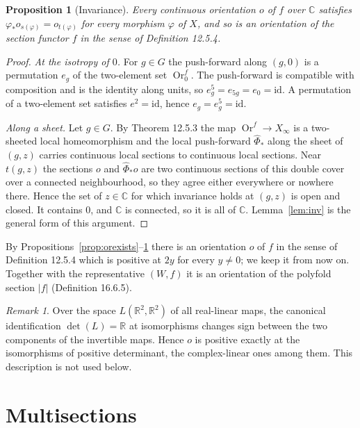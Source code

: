 \documentclass[11pt,a4paper]{article}
\theoremstyle{plain}
\newtheorem{proposition}[theorem]{Proposition}
\theoremstyle{definition}
\theoremstyle{remark}
\newtheorem{remark}[theorem]{Remark}
\newcommand{\C}{\mathbb{C}}
\newcommand{\R}{\mathbb{R}}
\newcommand{\abs}[1]{\lvert #1\rvert}
\newcommand{\Or}{\operatorname{Or}}
\newcommand{\id}{\mathrm{id}}
\begin{document}
\begin{proposition}[Invariance]\label{prop:orinvariant}
Every continuous orientation $o$ of $f$ over $\C$ satisfies $\varphi_*o_{s(\varphi)}=o_{t(\varphi)}$ for
every morphism $\varphi$ of $X$, and so is an orientation of the section functor $f$ in the sense of
Definition 12.5.4.
\end{proposition}

\begin{proof}
\emph{At the isotropy of $0$.} For $g\in G$ the push-forward along $(g,0)$ is a permutation $e_g$ of the
two-element set $\Or^f_0$. The push-forward is compatible with composition and is the identity along
units, so $e_g^5=e_{5g}=e_0=\id$. A permutation of a two-element set satisfies $e^2=\id$, hence
$e_g=e_g^5=\id$.

\emph{Along a sheet.} Let $g\in G$. By Theorem 12.5.3 the map $\Or^f\to X_\infty$ is a two-sheeted local
homeomorphism and the local push-forward $\hat\Phi_*$ along the sheet of $(g,z)$ carries continuous
local sections to continuous local sections. Near $t(g,z)$ the sections $o$ and $\hat\Phi_*o$ are two
continuous sections of this double cover over a connected neighbourhood, so they agree either everywhere
or nowhere there. Hence the set of $z\in\C$ for which invariance holds at $(g,z)$ is open and closed. It
contains $0$, and $\C$ is connected, so it is all of $\C$. Lemma~\ref{lem:inv} is the general form of
this argument.
\end{proof}

By Propositions~\ref{prop:orexists}--\ref{prop:orinvariant} there is an orientation $o$ of $f$ in the
sense of Definition 12.5.4 which is positive at $2y$ for every $y\neq0$; we keep it from now on.
Together with the representative $(W,f)$ it is an orientation of the polyfold section $\abs f$
(Definition 16.6.5).

\begin{remark}\label{rem:det}
Over the space $L(\R^2,\R^2)$ of all real-linear maps, the canonical identification $\det(L)=\R$ at
isomorphisms changes sign between the two components of the invertible maps. Hence $o$ is positive
exactly at the isomorphisms of positive determinant, the complex-linear ones among them. This
description is not used below.
\end{remark}

\section{Multisections}\label{sec:multi}
\end{document}
